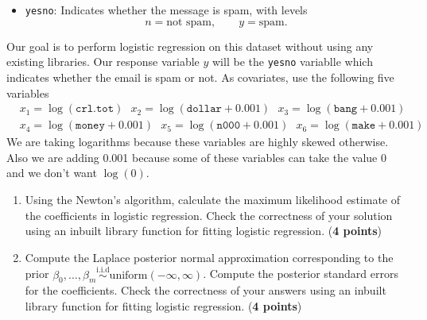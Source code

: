 \documentclass{scrartcl}
\begin{document}
\begin{enumerate}
\begin{itemize}
    \item \texttt{yesno}: Indicates whether the message is spam, with levels
    \[
    n = \text{not spam}, \qquad y = \text{spam}.
    \]
  \end{itemize}
Our goal is to perform logistic regression on this dataset without
using any existing libraries. Our response variable $y$ will be the
\texttt{yesno} 
  variablle which indicates whether the email is spam or not. As
  covariates, use the following five variables
  \begin{align*}
&    x_1 = \log \left(\texttt{crl.tot} \right)  ~~~ x_2 =
                   \log(\texttt{dollar} + 0.001)  ~~~ x_3= \log(\texttt{bang} + 0.001)  \\
    & x_4 = \log \left(\texttt{money} + 0.001 \right) ~~~ x_5 = \log
      \left(\texttt{n000} + 0.001 \right) ~~~ x_6 = \log
      \left(\texttt{make} + 0.001 \right)
  \end{align*}
We are taking logarithms because these variables are highly skewed
otherwise. Also we are adding 0.001 because some of these variables
can take the value 0 and we don't want $\log (0)$.
\begin{enumerate}
\item Using the Newton's algorithm, calculate the maximum likelihood
  estimate of the coefficients in logistic regression. Check the
  correctness of your solution using an inbuilt library function for
  fitting logistic regression. (\textbf{4 points})

\item Compute the Laplace posterior normal approximation corresponding
  to the prior $\beta_0, \dots, \beta_m
  \overset{\text{i.i.d}}{\sim} \text{uniform}(-\infty,
  \infty)$. Compute the posterior standard errors for the
  coefficients. Check the correctness of your answers using an
  inbuilt library function for  fitting logistic
  regression. (\textbf{4 points})  
\end{enumerate}


\end{enumerate}
\end{document}
